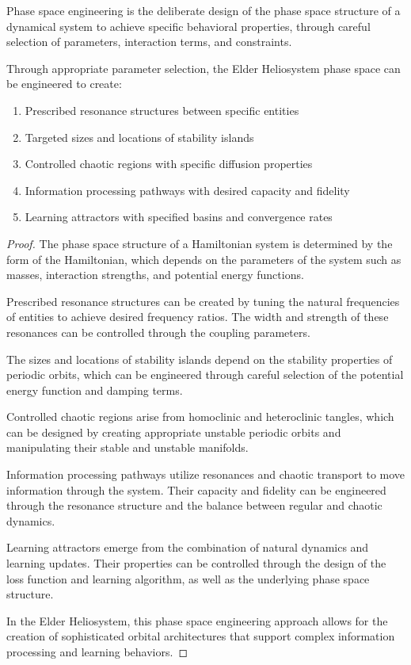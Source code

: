 \begin{definition}
Phase space engineering is the deliberate design of the phase space structure of a dynamical system to achieve specific behavioral properties, through careful selection of parameters, interaction terms, and constraints.
\end{definition}

\begin{theorem}
Through appropriate parameter selection, the Elder Heliosystem phase space can be engineered to create:
\begin{enumerate}
    \item Prescribed resonance structures between specific entities
    \item Targeted sizes and locations of stability islands
    \item Controlled chaotic regions with specific diffusion properties
    \item Information processing pathways with desired capacity and fidelity
    \item Learning attractors with specified basins and convergence rates
\end{enumerate}
\end{theorem}

\begin{proof}
The phase space structure of a Hamiltonian system is determined by the form of the Hamiltonian, which depends on the parameters of the system such as masses, interaction strengths, and potential energy functions.

Prescribed resonance structures can be created by tuning the natural frequencies of entities to achieve desired frequency ratios. The width and strength of these resonances can be controlled through the coupling parameters.

The sizes and locations of stability islands depend on the stability properties of periodic orbits, which can be engineered through careful selection of the potential energy function and damping terms.

Controlled chaotic regions arise from homoclinic and heteroclinic tangles, which can be designed by creating appropriate unstable periodic orbits and manipulating their stable and unstable manifolds.

Information processing pathways utilize resonances and chaotic transport to move information through the system. Their capacity and fidelity can be engineered through the resonance structure and the balance between regular and chaotic dynamics.

Learning attractors emerge from the combination of natural dynamics and learning updates. Their properties can be controlled through the design of the loss function and learning algorithm, as well as the underlying phase space structure.

In the Elder Heliosystem, this phase space engineering approach allows for the creation of sophisticated orbital architectures that support complex information processing and learning behaviors.
\end{proof}

